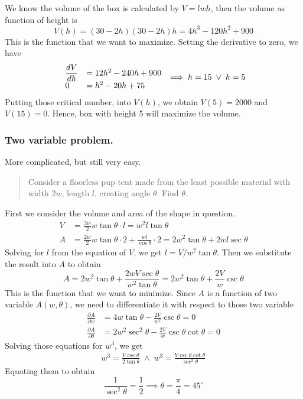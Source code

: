 \documentclass[../../../main.tex]{subfiles}
\begin{document}
We know the volume of the box is calculated by $V=lwh$, then the volume as function of height is
\begin{equation*}
    V(h)=(30-2h)(30-2h)h=4h^3-120h^2+900
\end{equation*}
This is the function that we want to maximize. Setting the derivative to zero, we have
\begin{equation*}
    \begin{array}{l l}
        \dfrac{dV}{dh} & =12h^2-240h+900 \\
        0              & =h^2-20h+75
    \end{array}\implies
    h=15\;\lor\; h=5
\end{equation*}
Putting those critical number, into $V(h)$, we obtain $V(5)=2000$ and $V(15)=0$. Hence, box with height 5 will maximize the volume.

\subsubsection{Two variable problem.} More complicated, but still very easy.
\begin{quotation}
    Consider a floorless pup tent made from the least possible material with width $2w$, length $l$, creating angle $\theta$. Find $\theta$.
\end{quotation}

First we consider the volume and area of the shape in question.
\begin{align*}
    V & =\frac{2w}{2}w\tan \theta\cdot l=w^2l\tan\theta                                               \\
    A & =\frac{2w}{2}w\tan \theta\cdot 2+\frac{wl}{\cos \theta}\cdot 2= 2w^2\tan\theta+2wl\sec \theta
\end{align*}
Solving for $l$ from the equation of $V$, we get $l=V/w^2\tan \theta$. Then we substitute the result into $A$ to obtain
\begin{equation*}
    A=2w^2\tan\theta+\frac{2wV\sec \theta}{w^2\tan\theta}= 2w^2\tan\theta+\frac{2V}{w}\csc\theta
\end{equation*}
This is the function that we want to minimize. Since $A$ is a function of two variable $A(w,\theta)$, we need to differentiate it with respect to those two variable
\begin{align*}
    \frac{\partial A}{\partial w}      & =4w\tan \theta-\frac{2V}{w^2}\csc \theta=0           \\
    \frac{\partial A}{\partial \theta} & =2w^2\sec^2\theta-\frac{2V}{w}\csc\theta\cot\theta=0
\end{align*}
Solving those equations for $w^3$, we get
\begin{align*}
    w^3=\frac{V\csc\theta}{2\tan\theta}\;\land\; w^3=\frac{V\csc\theta\cot\theta}{\sec^2\theta}
\end{align*}
Equating them to obtain
\begin{equation*}
    \frac{1}{\sec^2\theta}=\frac{1}{2}\implies \theta=\frac{\pi}{4}=45^\circ
\end{equation*}
\end{document}
